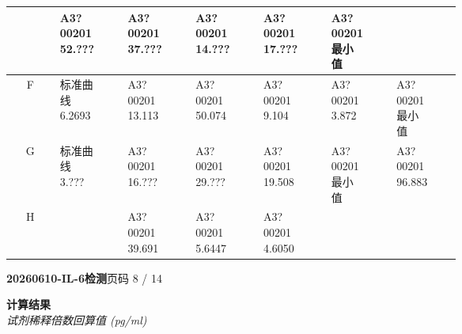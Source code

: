 \documentclass[UTF8,10pt,a4paper,fontset=fandol]{ctexart}
\begin{document}
\begin{center}
\begin{tabular}{c|*{12}{p{0.055\linewidth}|}}
 &
\shortstack{A3?00201\\52.???} &
 &
\shortstack{A3?00201\\37.???} &
 &
\shortstack{A3?00201\\14.???} &
 &
\shortstack{A3?00201\\17.???} &
 &
\shortstack{A3?00201\\最小值} &
\\ \hline
F &
\shortstack{标准曲线\\6.2693} &
 &
\shortstack{A3?00201\\13.113} &
 &
\shortstack{A3?00201\\50.074} &
 &
\shortstack{A3?00201\\9.104} &
 &
\shortstack{A3?00201\\3.872} &
 &
\shortstack{A3?00201\\最小值} &
\\ \hline
G &
\shortstack{标准曲线\\3.???} &
 &
\shortstack{A3?00201\\16.???} &
 &
\shortstack{A3?00201\\29.???} &
 &
\shortstack{A3?00201\\19.508} &
 &
\shortstack{A3?00201\\最小值} &
 &
\shortstack{A3?00201\\96.883} &
\\ \hline
H &
 &
 &
\shortstack{A3?00201\\39.691} &
 &
\shortstack{A3?00201\\5.6447} &
 &
\shortstack{A3?00201\\4.6050} &
 &
 &
 &
 &
\end{tabular}
\end{center}


\newpage

\begin{center}
\textbf{20260610-IL-6检测}\hfill 页码 8 / 14
\end{center}

\noindent
\textbf{计算结果}\\
\textit{试剂稀释倍数回算值 (pg/ml)}
\end{document}
